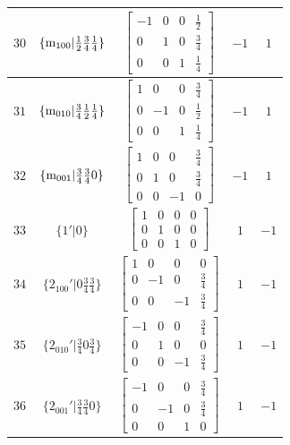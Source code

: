 \documentclass[fleqn,8pt]{jsarticle}
\begin{document}
\begin{longtable}{ccccc}
$ 30 $ & $ \{{\rm m}_{100}|\frac{1}{2} \frac{3}{4} \frac{1}{4}\} $ & $ \begin{bmatrix} -1 & 0 & 0 & \frac{1}{2} \\ 0 & 1 & 0 & \frac{3}{4} \\ 0 & 0 & 1 & \frac{1}{4} \end{bmatrix} $ & $ -1 $ & $ 1 $ \\ \hline
$ 31 $ & $ \{{\rm m}_{010}|\frac{3}{4} \frac{1}{2} \frac{1}{4}\} $ & $ \begin{bmatrix} 1 & 0 & 0 & \frac{3}{4} \\ 0 & -1 & 0 & \frac{1}{2} \\ 0 & 0 & 1 & \frac{1}{4} \end{bmatrix} $ & $ -1 $ & $ 1 $ \\ \hline
$ 32 $ & $ \{{\rm m}_{001}|\frac{3}{4} \frac{3}{4} 0\} $ & $ \begin{bmatrix} 1 & 0 & 0 & \frac{3}{4} \\ 0 & 1 & 0 & \frac{3}{4} \\ 0 & 0 & -1 & 0 \end{bmatrix} $ & $ -1 $ & $ 1 $ \\ \hline
$ 33 $ & $ \{1{}'|0\} $ & $ \begin{bmatrix} 1 & 0 & 0 & 0 \\ 0 & 1 & 0 & 0 \\ 0 & 0 & 1 & 0 \end{bmatrix} $ & $ 1 $ & $ -1 $ \\ \hline
$ 34 $ & $ \{2{}_{100}{}'|0 \frac{3}{4} \frac{3}{4}\} $ & $ \begin{bmatrix} 1 & 0 & 0 & 0 \\ 0 & -1 & 0 & \frac{3}{4} \\ 0 & 0 & -1 & \frac{3}{4} \end{bmatrix} $ & $ 1 $ & $ -1 $ \\ \hline
$ 35 $ & $ \{2{}_{010}{}'|\frac{3}{4} 0 \frac{3}{4}\} $ & $ \begin{bmatrix} -1 & 0 & 0 & \frac{3}{4} \\ 0 & 1 & 0 & 0 \\ 0 & 0 & -1 & \frac{3}{4} \end{bmatrix} $ & $ 1 $ & $ -1 $ \\ \hline
$ 36 $ & $ \{2{}_{001}{}'|\frac{3}{4} \frac{3}{4} 0\} $ & $ \begin{bmatrix} -1 & 0 & 0 & \frac{3}{4} \\ 0 & -1 & 0 & \frac{3}{4} \\ 0 & 0 & 1 & 0 \end{bmatrix} $ & $ 1 $ & $ -1 $ \\ \hline

\end{longtable}
\end{document}
